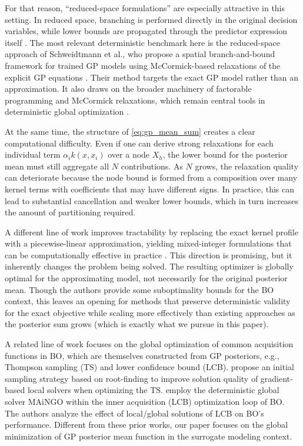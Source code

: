 \documentclass[pdflatex,sn-mathphys-num]{sn-jnl}%
\theoremstyle{thmstyleone}%
\theoremstyle{thmstyletwo}%
\theoremstyle{thmstylethree}%
\begin{document}
For that reason, ``reduced-space formulations'' are especially attractive in this setting. In reduced space, branching is performed directly in the original decision variables, while lower bounds are propagated through the predictor expression itself \cite{ref:reduced_space_bb,ref:deterministic_global_opt_text}. The most relevant deterministic benchmark here is the reduced-space approach of Schweidtmann et al., who propose a spatial branch-and-bound framework for trained GP models using McCormick-based relaxations of the explicit GP equations \cite{ref:gp_embedded_exact}. Their method targets the exact GP model rather than an approximation. It also draws on the broader machinery of factorable programming and McCormick relaxations, which remain central tools in deterministic global optimization \cite{ref:mccormick,ref:mccormick_algorithms,ref:global_opt_text_a,ref:global_opt_text_b}.

At the same time, the structure of \eqref{eq:gp_mean_sum} creates a clear computational difficulty. Even if one can derive strong relaxations for each individual term $\alpha_i k(x,x_i)$ over a node $X_h$, the lower bound for the posterior mean must still aggregate all $N$ contributions. As $N$ grows, the relaxation quality can deteriorate because the node bound is formed from a composition over many kernel terms with coefficients that may have different signs. In practice, this can lead to substantial cancellation and weaker lower bounds, which in turn increases the amount of partitioning required.

A different line of work improves tractability by replacing the exact kernel profile with a piecewise-linear approximation, yielding mixed-integer formulations that can be computationally effective in practice \cite{ref:pwl_kernel_aistats}. This direction is promising, but it inherently changes the problem being solved. The resulting optimizer is globally optimal for the approximating model, not necessarily for the original posterior mean. Though the authors provide some suboptimality bounds for the BO context, this leaves an opening for methods that preserve deterministic validity for the exact objective while scaling more effectively than existing approaches as the posterior sum grows (which is exactly what we pursue in this paper).

A related line of work focuses on the global optimization of common acquisition functions in BO, which are themselves constructed from GP posteriors, e.g., Thompson sampling (TS) and lower confidence bound (LCB). \citet{adebiyi2024optimizing} propose an initial sampling strategy based on root-finding to improve solution quality of gradient-based local solvers when optimizing the TS.  \citet{georgiou2025deterministic} employ the deterministic global solver MAiNGO \cite{ref:maingo} within the inner acquisition (LCB) optimization loop of BO. The authors analyze the effect of local/global solutions of LCB on BO's performance. Different from these prior works, our paper focuses on the global minimization of GP posterior mean function in the surrogate modeling context.
\end{document}
